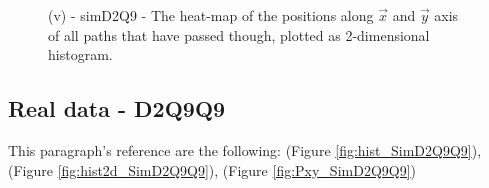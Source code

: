 \documentclass[class=article, crop=false]{standalone}
\begin{document}
\begin{figure}[!htb]
    \centering
        \quad\quad
    \caption{(v) - simD2Q9 - The heat-map of the positions along $\vec x$ and $\vec y$ axis of all paths that have passed though, plotted as 2-dimensional histogram.}
    \label{fig:Pxy_SimD2Q9}
\end{figure}


\FloatBarrier
\subsection{Real data - D2Q9Q9}
This paragraph's reference are the following: (Figure \ref{fig:hist_SimD2Q9Q9}), (Figure \ref{fig:hist2d_SimD2Q9Q9}), (Figure \ref{fig:Pxy_SimD2Q9Q9}) 
\end{document}
